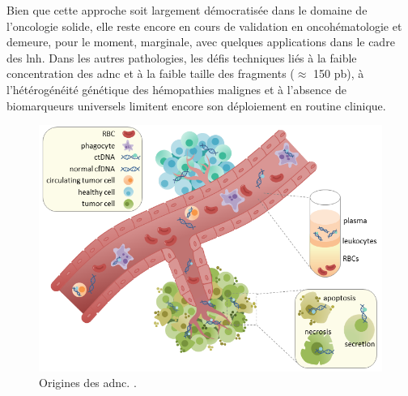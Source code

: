 Bien que cette approche soit largement démocratisée dans le domaine de l'oncologie solide, elle reste encore en cours de validation en oncohématologie et demeure,
pour le moment, marginale, avec quelques applications dans le cadre des \gls{lnh}. Dans les autres pathologies, les défis techniques liés à la faible concentration des 
\gls{adnc} et à la faible taille des fragments ($\approx$ 150 pb), à l'hétérogénéité génétique des hémopathies malignes et à l'absence de biomarqueurs universels 
limitent encore son déploiement en routine clinique.

\begin{figure}[H]
    \includegraphics[width=1\textwidth]{images/ctdna.png}
    \caption{Origines des \gls{adnc}. \citeauthor{racheljunewongEnglishCirculatingTumor2017} \cite{racheljunewongEnglishCirculatingTumor2017}.}
    \label{fig:ctdna}
\end{figure}
    

